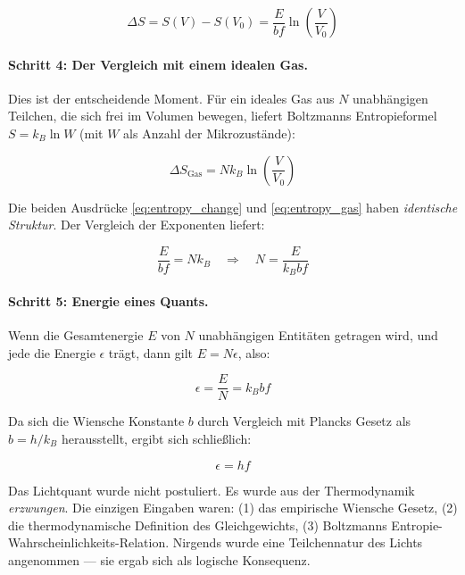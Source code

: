 \begin{equation}
    \Delta S = S(V) - S(V_0) = \frac{E}{bf} \ln\!\left(\frac{V}{V_0}\right)
    \label{eq:entropy_change}
\end{equation}

\paragraph{Schritt 4: Der Vergleich mit einem idealen Gas.}
Dies ist der entscheidende Moment. Für ein ideales Gas aus $N$ unabhängigen Teilchen, 
die sich frei im Volumen bewegen, liefert Boltzmanns Entropieformel $S = k_B \ln W$ 
(mit $W$ als Anzahl der Mikrozustände):

\begin{equation}
    \Delta S_{\text{Gas}} = N k_B \ln\!\left(\frac{V}{V_0}\right)
    \label{eq:entropy_gas}
\end{equation}

Die beiden Ausdrücke \eqref{eq:entropy_change} und \eqref{eq:entropy_gas} haben 
\emph{identische Struktur}. Der Vergleich der Exponenten liefert:

\begin{equation}
    \frac{E}{bf} = N k_B \quad \Longrightarrow \quad N = \frac{E}{k_B b f}
    \label{eq:quanta_count}
\end{equation}

\paragraph{Schritt 5: Energie eines Quants.}
Wenn die Gesamtenergie $E$ von $N$ unabhängigen Entitäten getragen wird, und jede 
die Energie $\epsilon$ trägt, dann gilt $E = N\epsilon$, also:

\begin{equation}
    \epsilon = \frac{E}{N} = k_B b f
    \label{eq:quantum_energy_wien}
\end{equation}

Da sich die Wiensche Konstante $b$ durch Vergleich mit Plancks Gesetz als 
$b = h/k_B$ herausstellt, ergibt sich schließlich:

\begin{equation}
    \boxed{\epsilon = hf}
    \label{eq:quantum_energy_final}
\end{equation}

\begin{revolutionary}
    Das Lichtquant wurde nicht postuliert. Es wurde aus der Thermodynamik 
    \emph{erzwungen}. Die einzigen Eingaben waren: (1) das empirische Wiensche Gesetz, 
    (2) die thermodynamische Definition des Gleichgewichts, (3) Boltzmanns 
    Entropie-Wahrscheinlichkeits-Relation. Nirgends wurde eine Teilchennatur des 
    Lichts angenommen — sie ergab sich als logische Konsequenz.
\end{revolutionary}

